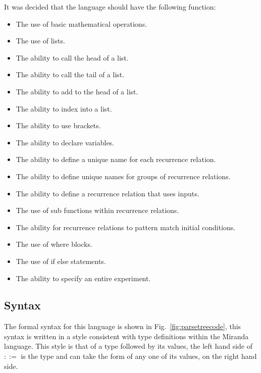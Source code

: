 \documentclass{article}
\begin{document}
It was decided that the language should have the following function:
\begin{itemize}
  \item The use of basic mathematical operations.%
  \item The use of lists.%
  \item The ability to call the head of a list.%
  \item The ability to call the tail of a list.%
  \item The ability to add to the head of a list.%
  \item The ability to index into a list.%
  \item The ability to use brackets.%
  \item The ability to declare variables.  
  \item The ability to define a unique name for each recurrence relation.
  \item The ability to define unique names for groups of recurrence relations. 
  \item The ability to define a recurrence relation that uses inputs.
  \item The use of sub functions within recurrence relations. 
  \item The ability for recurrence relations to pattern match initial conditions.  
  \item The use of where blocks.%
  \item The use of if else statements.%
  \item The ability to specify an entire experiment.  
\end{itemize}



\subsection{Syntax}



The formal syntax for this language is shown in Fig.~\ref{fig:parsetreecode}, this syntax is written in a style consistent with type definitions within the Miranda language. This style is that of a type followed by its values, the left hand side of $::=$ is the type and can take the form of any one of its values, on the right hand side. 
\end{document}
